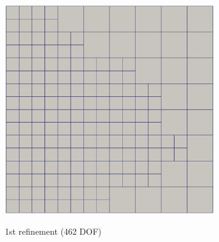 \begin{figure}[h!]
\begin{subfigure}[b]{0.4\linewidth}
{            \includegraphics{adaptivity/ex_images/ex_short_cantilever_mesh_462.eps}
        }
        \caption{1st refinement (462 DOF)}
    \end{subfigure}
    \begin{subfigure}[b]{0.4\linewidth}
        \centering
\end{subfigure}
\end{figure}
